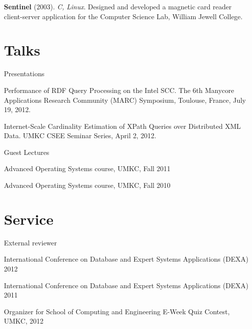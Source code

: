 \documentclass[margin,line]{resume}
\begin{document}
\begin{resume}
\vspace{-2mm}
    \textbf{Sentinel} (2003). \textsl{C, Linux}. Designed and developed a magnetic card reader client-server application for the Computer Science Lab, William Jewell College.
    
    \section{\mysidestyle Talks}

    Presentations
    \begin{list2}
    \item Performance of RDF Query Processing on the Intel SCC. The 6th Manycore Applications Research Community (MARC) Symposium, Toulouse, France, July 19, 2012.
    \item Internet-Scale Cardinality Estimation of XPath Queries over Distributed XML Data. UMKC CSEE Seminar Series, April 2, 2012.
    \end{list2}
\vspace{-2mm}
    Guest Lectures
    \begin{list2}
    \item Advanced Operating Systems course, UMKC, Fall 2011
    \item Advanced Operating Systems course, UMKC, Fall 2010
    \end{list2}

    \section{\mysidestyle Service}
    External reviewer
    \begin{list2}
    \item International Conference on Database and Expert Systems Applications (DEXA) 2012
    \item International Conference on Database and Expert Systems Applications (DEXA) 2011
    \end{list2}
\vspace{-2mm}
    Organizer for School of Computing and Engineering E-Week Quiz Contest, UMKC, 2012
 
\end{resume}
\end{document}
